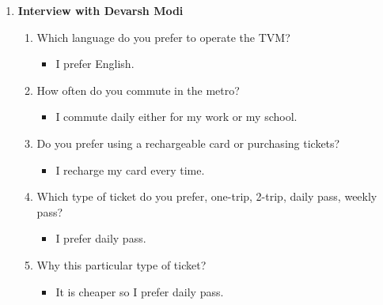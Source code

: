 \documentclass[15pt]{article}
\begin{document}
\begin{appendices}
\begin{enumerate}[leftmargin=3em, itemsep=0pt, parsep=0pt, , font=\Large\bfseries]
    \vspace{0.2cm}
    \item {\Large\bfseries Interview with Devarsh Modi}\\
    \begin{enumerate}[leftmargin=2em, itemsep=0pt, parsep=0pt, , font=\Large\bfseries]
        \item {\Large Which language do you prefer to operate the TVM?}
        \vspace{0.1cm}
            \begin{itemize}
                \item {\Large I prefer English.}
            \end{itemize}
            \vspace{0.2cm}
        \item {\Large How often do you commute in the metro?}
        \vspace{0.1cm}
            \begin{itemize}
                \item {\Large I commute daily  either for my work or my school.}
            \end{itemize}
            \vspace{0.2cm}
        \item {\Large Do you prefer using a rechargeable card or purchasing tickets?}
        \vspace{0.1cm}
            \begin{itemize}
                \item {\Large  I recharge my card every time.}
            \end{itemize}
            \vspace{0.2cm}
        \item {\Large Which type of ticket do you prefer, one-trip, 2-trip, daily pass, weekly pass?}
        \vspace{0.1cm}
            \begin{itemize}
                \item {\Large I prefer daily pass.}
            \end{itemize}
            \vspace{0.2cm}
        \item {\Large Why this particular type of ticket?}
        \vspace{0.1cm}
            \begin{itemize}
                \item {\Large  It is cheaper so I prefer daily pass.}

\end{itemize}
\end{enumerate}
\end{enumerate}
\end{appendices}
\end{document}
